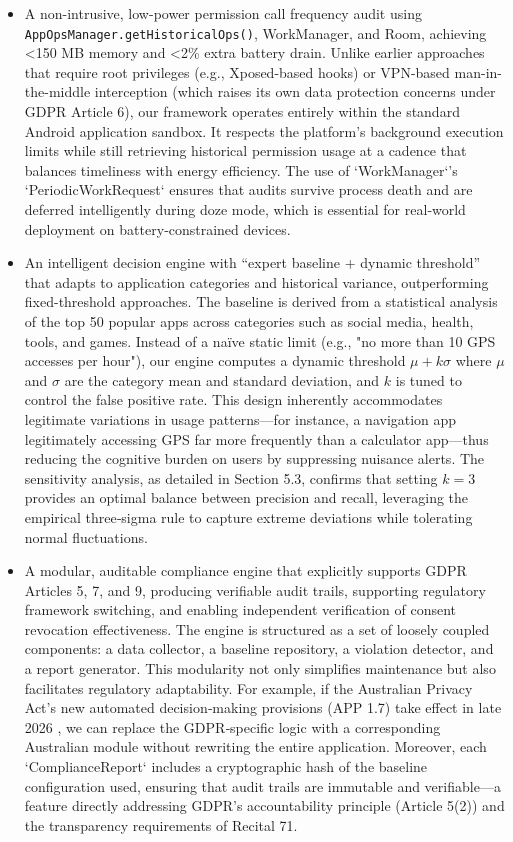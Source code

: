 \begin{itemize}
\item A non-intrusive, low-power permission call frequency audit using \texttt{AppOpsManager.getHistoricalOps()}, WorkManager, and Room, achieving <150 MB memory and <2\% extra battery drain. Unlike earlier approaches that require root privileges (e.g., Xposed-based hooks) or VPN-based man-in-the-middle interception (which raises its own data protection concerns under GDPR Article 6), our framework operates entirely within the standard Android application sandbox. It respects the platform's background execution limits while still retrieving historical permission usage at a cadence that balances timeliness with energy efficiency. The use of `WorkManager`'s `PeriodicWorkRequest` ensures that audits survive process death and are deferred intelligently during doze mode, which is essential for real‑world deployment on battery‑constrained devices.

\item An intelligent decision engine with ``expert baseline + dynamic threshold'' that adapts to application categories and historical variance, outperforming fixed-threshold approaches. The baseline is derived from a statistical analysis of the top 50 popular apps across categories such as social media, health, tools, and games. Instead of a naïve static limit (e.g., "no more than 10 GPS accesses per hour"), our engine computes a dynamic threshold $\mu + k\sigma$ where $\mu$ and $\sigma$ are the category mean and standard deviation, and $k$ is tuned to control the false positive rate. This design inherently accommodates legitimate variations in usage patterns—for instance, a navigation app legitimately accessing GPS far more frequently than a calculator app—thus reducing the cognitive burden on users by suppressing nuisance alerts. The sensitivity analysis, as detailed in Section 5.3, confirms that setting $k=3$ provides an optimal balance between precision and recall, leveraging the empirical three‑sigma rule to capture extreme deviations while tolerating normal fluctuations.

\item A modular, auditable compliance engine that explicitly supports GDPR Articles 5, 7, and 9, producing verifiable audit trails, supporting regulatory framework switching, and enabling independent verification of consent revocation effectiveness. The engine is structured as a set of loosely coupled components: a data collector, a baseline repository, a violation detector, and a report generator. This modularity not only simplifies maintenance but also facilitates regulatory adaptability. For example, if the Australian Privacy Act's new automated decision‑making provisions (APP 1.7) take effect in late 2026 \cite{2}, we can replace the GDPR‑specific logic with a corresponding Australian module without rewriting the entire application. Moreover, each `ComplianceReport` includes a cryptographic hash of the baseline configuration used, ensuring that audit trails are immutable and verifiable—a feature directly addressing GDPR's accountability principle (Article 5(2)) and the transparency requirements of Recital 71.


\end{itemize}
